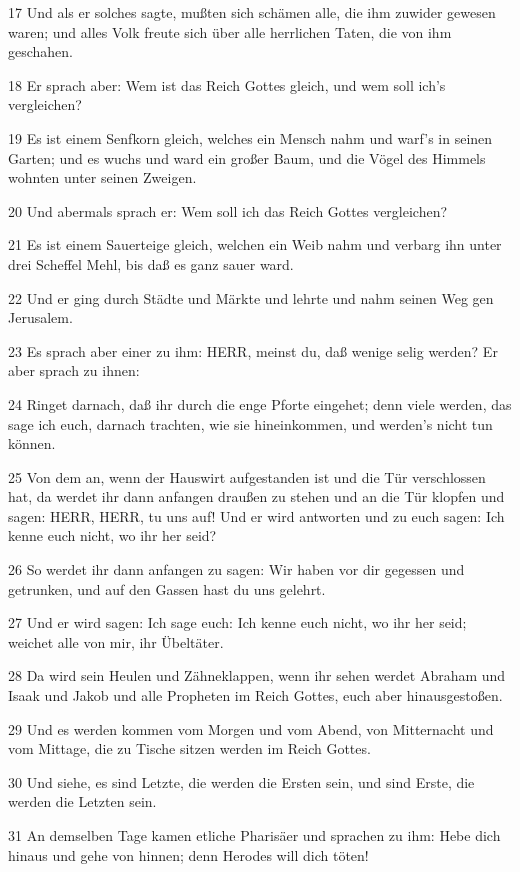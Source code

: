 \par 17 Und als er solches sagte, mußten sich schämen alle, die ihm zuwider gewesen waren; und alles Volk freute sich über alle herrlichen Taten, die von ihm geschahen.
\par 18 Er sprach aber: Wem ist das Reich Gottes gleich, und wem soll ich's vergleichen?
\par 19 Es ist einem Senfkorn gleich, welches ein Mensch nahm und warf's in seinen Garten; und es wuchs und ward ein großer Baum, und die Vögel des Himmels wohnten unter seinen Zweigen.
\par 20 Und abermals sprach er: Wem soll ich das Reich Gottes vergleichen?
\par 21 Es ist einem Sauerteige gleich, welchen ein Weib nahm und verbarg ihn unter drei Scheffel Mehl, bis daß es ganz sauer ward.
\par 22 Und er ging durch Städte und Märkte und lehrte und nahm seinen Weg gen Jerusalem.
\par 23 Es sprach aber einer zu ihm: HERR, meinst du, daß wenige selig werden? Er aber sprach zu ihnen:
\par 24 Ringet darnach, daß ihr durch die enge Pforte eingehet; denn viele werden, das sage ich euch, darnach trachten, wie sie hineinkommen, und werden's nicht tun können.
\par 25 Von dem an, wenn der Hauswirt aufgestanden ist und die Tür verschlossen hat, da werdet ihr dann anfangen draußen zu stehen und an die Tür klopfen und sagen: HERR, HERR, tu uns auf! Und er wird antworten und zu euch sagen: Ich kenne euch nicht, wo ihr her seid?
\par 26 So werdet ihr dann anfangen zu sagen: Wir haben vor dir gegessen und getrunken, und auf den Gassen hast du uns gelehrt.
\par 27 Und er wird sagen: Ich sage euch: Ich kenne euch nicht, wo ihr her seid; weichet alle von mir, ihr Übeltäter.
\par 28 Da wird sein Heulen und Zähneklappen, wenn ihr sehen werdet Abraham und Isaak und Jakob und alle Propheten im Reich Gottes, euch aber hinausgestoßen.
\par 29 Und es werden kommen vom Morgen und vom Abend, von Mitternacht und vom Mittage, die zu Tische sitzen werden im Reich Gottes.
\par 30 Und siehe, es sind Letzte, die werden die Ersten sein, und sind Erste, die werden die Letzten sein.
\par 31 An demselben Tage kamen etliche Pharisäer und sprachen zu ihm: Hebe dich hinaus und gehe von hinnen; denn Herodes will dich töten!
